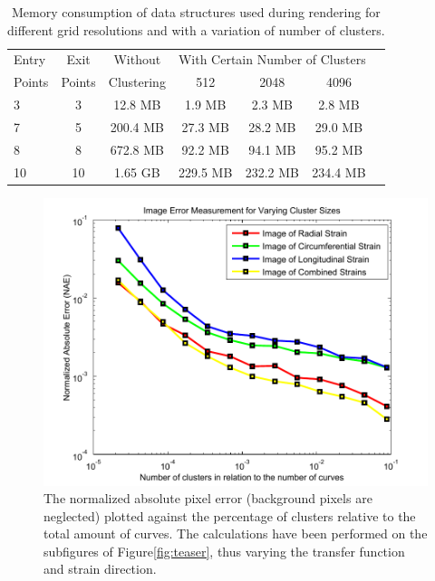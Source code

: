\documentclass[review,journal]{vgtc}         %
\begin{document}
\begin{table}[b]
  \caption{Memory consumption of data structures used during rendering for different grid resolutions and with a variation of number of clusters.}
  \label{tab:data_size}
  \begin{center}
    \begin{tabular}{|l|c|c|c|c|c|c|}
      \hline
      Entry & Exit &  Without & \multicolumn{3}{c|}{With Certain Number of Clusters}\\
      Points & Points & Clustering & 512 & 2048 & 4096\\
      \hline
      3 & 3 & 12.8 MB & 1.9 MB & 2.3 MB & 2.8 MB \\
      7 & 5 & 200.4 MB & 27.3 MB & 28.2 MB & 29.0 MB\\
      8 & 8 & 672.8 MB & 92.2 MB & 94.1 MB & 95.2 MB \\
      10 & 10 & 1.65 GB & 229.5 MB & 232.2 MB & 234.4 MB \\
      \hline
    \end{tabular}
  \end{center}
\end{table}

\begin{figure}[t]
    \centering 
		\includegraphics[width=1.0\linewidth]{figures/cluster_measurements/clusterErrorPlot}
    \caption{The normalized absolute pixel error (background pixels are neglected) plotted against the percentage of clusters relative to the total amount of curves. The calculations have been performed on the subfigures of Figure\ref{fig:teaser}, thus varying the transfer function and strain direction.}
    \label{fig:clustering_visual_error}
\end{figure}
\end{document}
